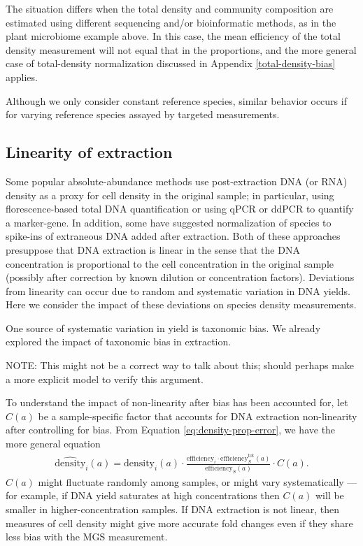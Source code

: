 \documentclass[
]{article}
\begin{document}
The situation differs when the total density and community composition are estimated using different sequencing and/or bioinformatic methods, as in the plant microbiome example above.
In this case, the mean efficiency of the total density measurement will not equal that in the proportions, and the more general case of total-density normalization discussed in Appendix \ref{total-density-bias} applies.

Although we only consider constant reference species, similar behavior occurs if for varying reference species assayed by targeted measurements.

\hypertarget{linearity-of-extraction}{%
\subsection{Linearity of extraction}\label{linearity-of-extraction}}

Some popular absolute-abundance methods use post-extraction DNA (or RNA) density as a proxy for cell density in the original sample; in particular, using florescence-based total DNA quantification or using qPCR or ddPCR to quantify a marker-gene.
In addition, some have suggested normalization of species to spike-ins of extraneous DNA added after extraction.
Both of these approaches presuppose that DNA extraction is linear in the sense that the DNA concentration is proportional to the cell concentration in the original sample (possibly after correction by known dilution or concentration factors).
Deviations from linearity can occur due to random and systematic variation in DNA yields.
Here we consider the impact of these deviations on species density measurements.

One source of systematic variation in yield is taxonomic bias.
We already explored the impact of taxonomic bias in extraction.

NOTE: This might not be a correct way to talk about this; should perhaps make a more explicit model to verify this argument.

To understand the impact of non-linearity after bias has been accounted for, let \(C(a)\) be a sample-specific factor that accounts for DNA extraction non-linearity after controlling for bias.
From Equation \eqref{eq:density-prop-error}, we have the more general equation
\begin{align}
  \label{eq:density-prop-error-linearity}
  \widehat{\text{density}}_{i}(a) 
  = \text{density}_{i}(a) \cdot \frac{\text{efficiency}_{i} \cdot \text{efficiency}^{\text{tot}}_S(a)}{\text{efficiency}_S(a)} \cdot C(a).
\end{align}
\(C(a)\) might fluctuate randomly among samples, or might vary systematically --- for example, if DNA yield saturates at high concentrations then \(C(a)\) will be smaller in higher-concentration samples.
If DNA extraction is not linear, then measures of cell density might give more accurate fold changes even if they share less bias with the MGS measurement.
\end{document}
